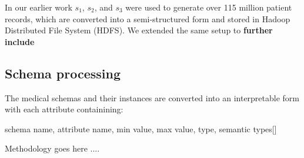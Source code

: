 In our earlier work \cite{Satti2020} $s_1$, $s_2$, and $s_3$ were used to generate over 115 million patient records, which are converted into a semi-structured form and stored in Hadoop Distributed File System (HDFS). We extended the same setup to \textbf{further include}



\subsection*{Schema processing}
\label{schema_prepro}
The medical schemas and their instances are converted into an interpretable form with each attribute containining:

schema name, attribute name, min value, max value, type, semantic types[]



Methodology goes here ....